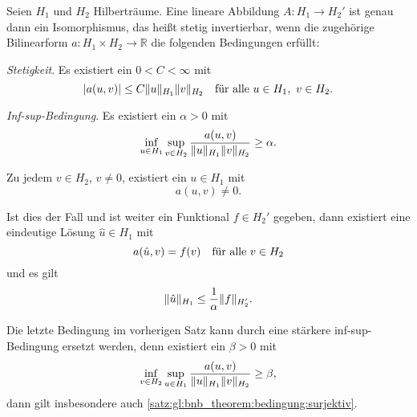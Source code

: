 \begin{Satz}
\label{satz:gl:bnb_theorem}
    Seien $H_{1}$ und $H_{2}$ Hilberträume.
    Eine lineare Abbildung $A \colon H_{1} \to H_{2}'$ ist genau dann ein Isomorphismus, das heißt stetig invertierbar, wenn die zugehörige Bilinearform $a \colon H_{1} \times H_{2} \to \mathbb{R}$ die folgenden Bedingungen erfüllt:
    \begin{thmenumerate}
        \item \label{satz:gl:bnb_theorem:bedingung:stetig}
        \emph{Stetigkeit}.
        Es existiert ein $0 < C < \infty$ mit
        \begin{equation}
            \abs{a(u, v)} \leq C \norm{u}_{H_{1}} \norm{v}_{H_{2}} \quad \fa u \in H_{1},~v\in H_{2}.
        \end{equation}
        \item \label{satz:gl:bnb_theorem:bedingung:inf_sup}
        \emph{Inf-sup-Bedingung}.
        Es existiert ein $\alpha > 0$ mit
        \begin{equation}
            \inf_{u \in H_{1}} \sup_{v \in H_{2}} \frac{a(u, v)}{\norm{u}_{H_{1}} \norm{v}_{H_{2}}} \geq \alpha.
        \end{equation}
        \item \label{satz:gl:bnb_theorem:bedingung:surjektiv}
        Zu jedem $v \in H_{2}$, $v \neq 0$, existiert ein $u \in H_{1}$ mit
        \begin{equation}
            a(u, v) \neq 0.
        \end{equation}
    \end{thmenumerate}
    Ist dies der Fall und ist weiter ein Funktional $f \in H_{2}'$ gegeben, dann existiert eine eindeutige Lösung $\hat u \in H_{1}$ mit
    \begin{equation}
        a(\hat u, v) = f(v) \quad \fa v \in H_{2}
    \end{equation}
    und es gilt
    \begin{equation}
        \norm{\hat u}_{H_{1}} \leq \frac{1}{\alpha} \norm{f}_{H_{2}'}.
    \end{equation}
\end{Satz}

\begin{Bemerkung}
    Die letzte Bedingung im vorherigen Satz kann durch eine stärkere inf-sup-Bedingung ersetzt werden, denn existiert ein $\beta > 0$ mit
    \begin{equation}
        \inf_{v \in H_{2}} \sup_{u \in H_{1}} \frac{a(u, v)}{\norm{u}_{H_{1}} \norm{v}_{H_{2}}} \geq \beta,
    \end{equation}
    dann gilt insbesondere auch \ref{satz:gl:bnb_theorem:bedingung:surjektiv}.
\end{Bemerkung}

